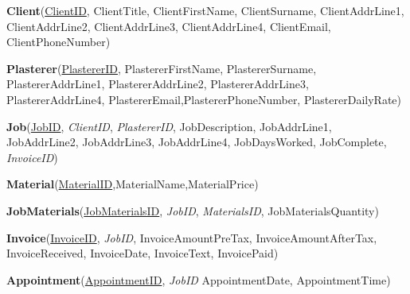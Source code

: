 \begin{flushleft}
	\textbf{Client}(\underline{ClientID}, ClientTitle, ClientFirstName, ClientSurname, ClientAddrLine1, ClientAddrLine2, ClientAddrLine3, ClientAddrLine4, ClientEmail, ClientPhoneNumber)
\end{flushleft}



\begin{flushleft}
	\textbf{Plasterer}(\underline{PlastererID}, PlastererFirstName, PlastererSurname, PlastererAddrLine1, PlastererAddrLine2, PlastererAddrLine3, PlastererAddrLine4, PlastererEmail,PlastererPhoneNumber, PlastererDailyRate)
\end{flushleft}



\begin{flushleft}
\textbf{Job}(\underline{JobID}, \emph{ClientID}, \emph{PlastererID}, JobDescription, JobAddrLine1, JobAddrLine2, JobAddrLine3, JobAddrLine4, JobDaysWorked,  JobComplete, \emph{InvoiceID})
\end{flushleft}


\begin{flushleft}
\textbf{Material}(\underline{MaterialID},MaterialName,MaterialPrice)
\end{flushleft}


\begin{flushleft}
\textbf{JobMaterials}(\underline{JobMaterialsID}, \emph{JobID}, \emph{MaterialsID}, JobMaterialsQuantity)
\end{flushleft}


\begin{flushleft}
\textbf{Invoice}(\underline{InvoiceID}, \emph{JobID}, InvoiceAmountPreTax, InvoiceAmountAfterTax, InvoiceReceived, InvoiceDate, InvoiceText, InvoicePaid)
\end{flushleft}



\begin{flushleft}
\textbf{Appointment}(\underline{AppointmentID}, \emph{JobID} AppointmentDate, AppointmentTime)
\end{flushleft}

